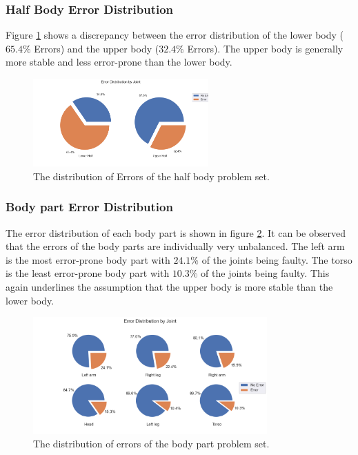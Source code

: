 \subsubsection{Half Body Error Distribution}

Figure \ref{fig:hb_pie} shows a discrepancy between the error distribution of the lower body ($65.4\%$ Errors) and the upper body ($32.4\%$ Errors). The upper body is generally more stable and less error-prone than the lower body.

\begin{figure}[ht]
  \centering
  \includegraphics[width=0.6\textwidth]{figures/Data/dist_half_body/Error_Distribution_by_Joint.png}
  \caption[Error Distribution by Body Half]{The distribution of Errors of the half body problem set.}
  \label{fig:hb_pie}
\end{figure}

\subsubsection{Body part Error Distribution}

The error distribution of each body part is shown in figure \ref{fig:lb_pie}. It can be observed that the errors of the body parts are individually very unbalanced. The left arm is the most error-prone body part with $24.1\%$ of the joints being faulty. The torso is the least error-prone body part with $10.3\%$ of the joints being faulty. This again underlines the assumption that the upper body is more stable than the lower body.

\begin{figure}[ht]
  \centering
  \includegraphics[width=0.8\textwidth]{figures/Data/dist_limbs/Error_Distribution_by_Joint.png}
  \caption[Error Distribution by Body part]{The distribution of errors of the body part problem set.}
  \label{fig:lb_pie}
\end{figure}

